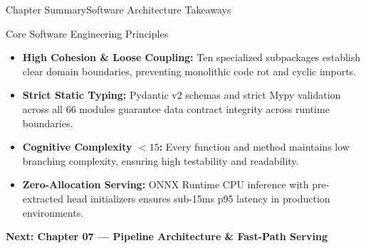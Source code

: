 \begin{frame}{Chapter Summary}{Software Architecture Takeaways}
    \begin{block}{Core Software Engineering Principles}
        \begin{itemize}\small
            \item \textbf{High Cohesion \& Loose Coupling:} Ten specialized subpackages establish clear domain boundaries, preventing monolithic code rot and cyclic imports.
            \item \textbf{Strict Static Typing:} Pydantic v2 schemas and strict Mypy validation across all 66 modules guarantee data contract integrity across runtime boundaries.
            \item \textbf{Cognitive Complexity $< 15$:} Every function and method maintains low branching complexity, ensuring high testability and readability.
            \item \textbf{Zero-Allocation Serving:} ONNX Runtime CPU inference with pre-extracted head initializers ensures sub-15ms p95 latency in production environments.
        \end{itemize}
    \end{block}

    \vspace{0.2cm}
    \begin{center}
        \textcolor{deepblue}{\textbf{Next: Chapter 07 --- Pipeline Architecture \& Fast-Path Serving}}
    \end{center}

\end{frame}
